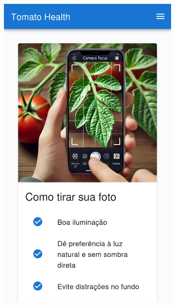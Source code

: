 \begin{figure}[htp]
    \centering
    \begin{subfigure}{0.3\textwidth}
        \centering
        \includegraphics[width=\linewidth, height=0.4\textheight, keepaspectratio]{images/diagnostic1.png}
    \end{subfigure}
    \begin{subfigure}{0.3\textwidth}
        \centering

\end{subfigure}
\end{figure}
